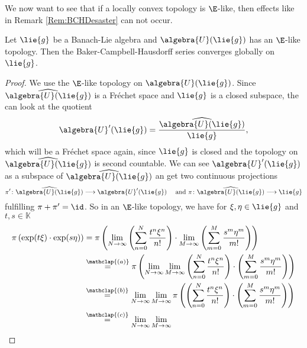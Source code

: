\documentclass[
11pt,                          %
english                        %
]{article}
\newcommand\ot[2]{\stackrel{\mathclap{#1}}{#2}}
\begin{document}
We now want to see that if a locally convex topology is $\E$-like, then effects 
like in Remark \ref{Rem:BCHDesaster} can not occur. 
\begin{proposition}
	Let $\lie{g}$ be a Banach-Lie algebra and $\algebra{U}(\lie{g})$ has an 
	$\E$-like topology. Then the Baker-Campbell-Hausdorff series converges globally 
	on $\lie{g}$.
\end{proposition}
\begin{proof}
	We use the $\E$-like topology on $\algebra{U}(\lie{g})$.
	Since $\widehat{\algebra{U}(\lie{g})}$ is a Fr\'echet space and $\lie{g}$ is a 
	closed subspace, the can look at the quotient 
	\begin{equation*}
		\algebra{U}'(\lie{g})
		=
		\frac{\widehat{\algebra{U}(\lie{g})}}{\lie{g}},
	\end{equation*}
	which will be a Fr\'echet space again, since $\lie{g}$ is closed and the 
	topology on $\widehat{\algebra{U}(\lie{g})}$ is second countable. We can see 
	$\algebra{U}'(\lie{g})$ as a subspace of $\widehat{\algebra{U}(\lie{g})}$ an 
	get two continuous projections
	\begin{equation*}
		\pi' \colon
		\widehat{\algebra{U}(\lie{g})}
		\longrightarrow
		\algebra{U}'(\lie{g})
		\quad \text{ and }
		\pi \colon
		\widehat{\algebra{U}(\lie{g})}
		\longrightarrow
		\lie{g}
	\end{equation*}
	fulfilling $\pi + \pi' = \id$. So in an $\E$-like topology, we have for $\xi, 
	\eta \in \lie{g}$ and $t,s \in \mathbb{K}$
	\begin{align*}
		\pi \left( \exp(t \xi) \cdot \exp(s \eta) \right)
		& =
		\pi
		\left(
			\lim_{N \rightarrow \infty}
			\left(
				\sum\limits_{n=0}^N
				\frac{t^n \xi^n}{n!}
			\right)
			\cdot
			\lim_{M \rightarrow \infty}
			\left(
				\sum\limits_{m=0}^M
				\frac{s^m \eta^m}{m!}
			\right)
		\right)
		\\
		& \ot{(a)}{=}
		\pi
		\left(
			\lim_{N \rightarrow \infty}
			\lim_{M \rightarrow \infty}
			\left(
				\sum\limits_{n=0}^N
				\frac{t^n \xi^n}{n!}
			\right)
			\cdot
			\left(
				\sum\limits_{m=0}^M
				\frac{s^m \eta^m}{m!}
			\right)
		\right)
		\\
		& \ot{(b)}{=}
		\lim_{N \rightarrow \infty}
		\lim_{M \rightarrow \infty}
		\pi
		\left(	
			\left(
				\sum\limits_{n=0}^N
				\frac{t^n \xi^n}{n!}
			\right)
			\cdot
			\left(
				\sum\limits_{m=0}^M
				\frac{s^m \eta^m}{m!}
			\right)
		\right)
		\\
		& \ot{(c)}{=}
		\lim_{N \rightarrow \infty}
		\lim_{M \rightarrow \infty}

\end{align*}
\end{proof}
\end{document}
